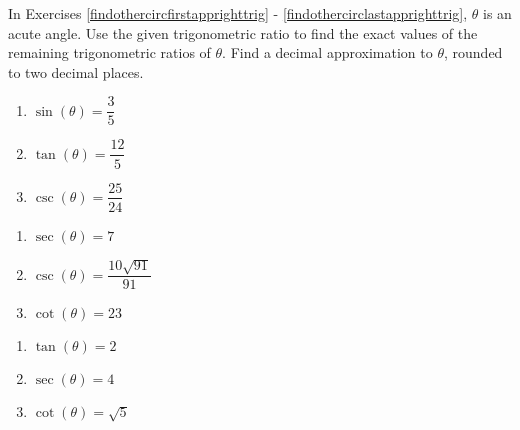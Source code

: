 \documentclass{ximera}
\begin{document}
\newpage

In Exercises \ref{findothercircfirstapprighttrig} - \ref{findothercirclastapprighttrig}, $\theta$ is an acute angle.  Use the given trigonometric ratio to find the exact values of the remaining trigonometric ratios of $\theta$.  Find a decimal approximation to $\theta$, rounded to two decimal places.

\begin{multicols}{3}

\begin{enumerate}
\setcounter{enumi}{\value{HW}}

\item $\sin(\theta) = \dfrac{3}{5}$  \label{findothercircfirstapprighttrig}
\item $\tan(\theta) = \dfrac{12}{5}$
\item $\csc(\theta) = \dfrac{25}{24}$

\setcounter{HW}{\value{enumi}}

\end{enumerate}

\end{multicols}

\begin{multicols}{3}

\begin{enumerate}

\setcounter{enumi}{\value{HW}}


\item $\sec(\theta) = 7$  
\item $\csc(\theta) = \dfrac{10\sqrt{91}}{91}$ 
\item $\cot(\theta) = 23$ 

\setcounter{HW}{\value{enumi}}

\end{enumerate}

\end{multicols}

\begin{multicols}{3}

\begin{enumerate}

\setcounter{enumi}{\value{HW}}




\item  $\tan(\theta) = 2$  
\item  $\sec(\theta) = 4$  
\item $\cot(\theta) = \sqrt{5}$ 

\setcounter{HW}{\value{enumi}}

\end{enumerate}

\end{multicols}
\end{document}
